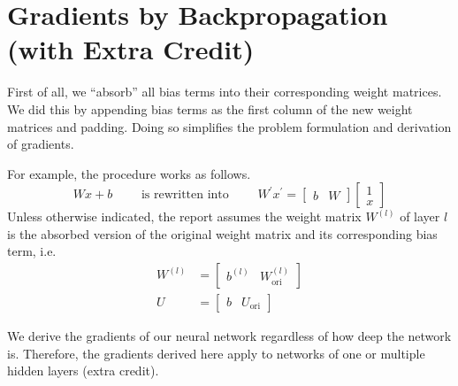 \documentclass[letterpaper]{article}
\begin{document}
 
\section{Gradients by Backpropagation (with Extra Credit)}\label{sec:grad}
First of all, we ``absorb'' all bias terms into their corresponding weight matrices.  We did this by appending bias terms as the first column of the new weight matrices and padding. Doing so simplifies the problem formulation and derivation of gradients.

For example, the procedure works as follows.
\begin{equation}
W x + b
\qquad
\textrm{ is rewritten into }
\qquad
W^\prime
x^\prime
=
\begin{bmatrix}
b & W
\end{bmatrix}
\begin{bmatrix}
1 \\ x
\end{bmatrix}
\end{equation}
Unless otherwise indicated, the report assumes the weight matrix $W^{(l)}$ of layer $l$ is the absorbed version of the original weight matrix and its corresponding bias term, i.e.
\begin{equation}
\begin{split}
W^{(l)} & =
\begin{bmatrix}
b^{(l)} & W^{(l)}_\textrm{ori}
\end{bmatrix} \\
U &=
\begin{bmatrix}
b & U_\textrm{ori}
\end{bmatrix}
\end{split}
\end{equation}


We derive the gradients of our neural network regardless
of how deep the network is. Therefore, the gradients derived here apply to networks of one or multiple hidden layers (extra credit).

\vspace{0.1cm}
\end{document}
